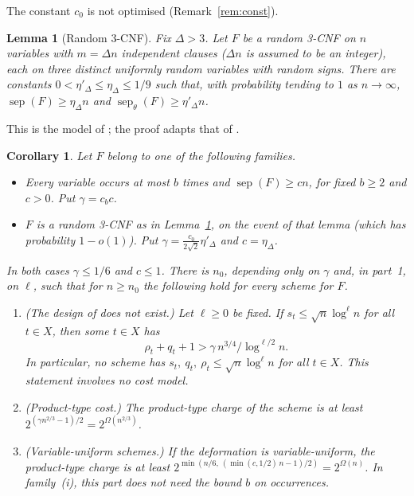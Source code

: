 \documentclass[11pt,a4paper]{article}
\newtheorem{lemma}[theorem]{Lemma}
\newtheorem{corollary}[theorem]{Corollary}
\theoremstyle{definition}
\theoremstyle{remark}
\newcommand{\sep}{\operatorname{sep}}
\newcommand{\sepw}{\operatorname{sep}_{\theta}}
\begin{document}
The constant $c_0$ is not optimised (Remark~\ref{rem:const}).

\begin{lemma}[Random 3-CNF]\label{lem:random}
Fix $\Delta>3$. Let $F$ be a random 3-CNF on $n$ variables with $m=\Delta n$ independent
clauses ($\Delta n$ is assumed to be an integer), each on three distinct uniformly random variables with random signs. There are
constants $0<\eta'_\Delta\le\eta_\Delta\le1/9$ such that, with probability tending to $1$
as $n\to\infty$, $\sep(F)\ge\eta_\Delta n$ and $\sepw(F)\ge\eta'_\Delta n$.
\end{lemma}

This is the model of \cite[Appendix~A]{DL}; the proof adapts that of \cite[Lemma~8.2]{DL}.

\begin{corollary}\label{cor:main}
Let $F$ belong to one of the following families.
\begin{itemize}
\item[\textup{(i)}] Every variable occurs at most $b$ times and $\sep(F)\ge cn$, for fixed
 $b\ge2$ and $c>0$. Put $\gamma=c_bc$.
\item[\textup{(ii)}] $F$ is a random 3-CNF as in Lemma~\ref{lem:random}, on the event of
 that lemma (which has probability $1-o(1)$). Put
 $\gamma=\frac{c_0}{2\sqrt2}\eta'_\Delta$ and $c=\eta_\Delta$.
\end{itemize}
In both cases $\gamma\le1/6$ and $c\le1$. There is $n_0$, depending only on $\gamma$ and, in
part~1, on $\ell$, such that for $n\ge n_0$ the following hold for every scheme for $F$.
\begin{enumerate}
\item \textup{(The design of \cite[Section~9]{DL} does not exist.)} Let $\ell\ge0$ be fixed.
 If $s_t\le\sqrt n\log^{\ell}n$ for all $t\in X$, then some $t\in X$ has
 \[\rho_t+q_t+1>\gamma\,n^{3/4}/\log^{\ell/2}n .\]
 In particular, no scheme has $s_t,\ q_t,\ \rho_t\le\sqrt n\log^{\ell}n$ for all $t\in X$.
 This statement involves no cost model.
\item \textup{(Product-type cost.)} The product-type charge of the scheme is at least
 $2^{(\gamma n^{2/3}-1)/2}=2^{\Omega(n^{2/3})}$.
\item \textup{(Variable-uniform schemes.)} If the deformation is variable-uniform, the
 product-type charge is at least $2^{\min(n/6,\ (\min(c,1/2)\,n-1)/2)}=2^{\Omega(n)}$. In
 family~\textup{(i)}, this part does not need the bound $b$ on occurrences.
\end{enumerate}
\end{corollary}
\end{document}
